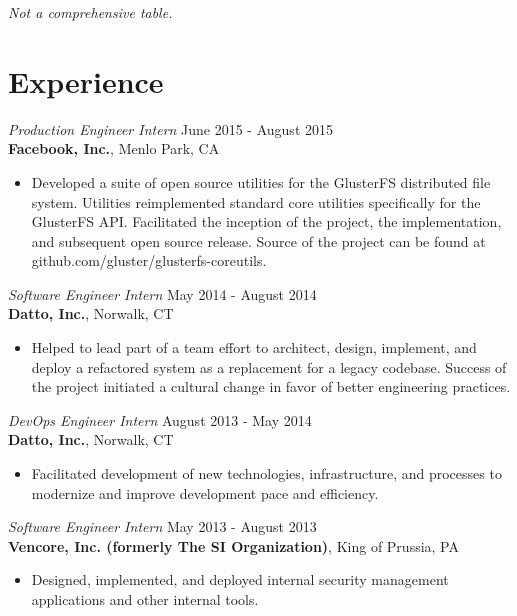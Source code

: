 \documentclass[margin]{res}
\begin{document}
\begin{resume}
\vspace{-0.25cm}
\textit{Not a comprehensive table.}

\section{Experience}

{\sl Production Engineer Intern} \hfill June 2015 - August 2015 \\
\textbf{Facebook, Inc.}, Menlo Park, CA
\begin{itemize}
    \item Developed a suite of open source utilities for the GlusterFS
          distributed file system. Utilities reimplemented standard core
          utilities specifically for the GlusterFS API. Facilitated the
          inception of the project, the implementation, and subsequent open
          source release. Source of the project can be found at
          github.com/gluster/glusterfs-coreutils.
\end{itemize}

{\sl Software Engineer Intern} \hfill May 2014 - August 2014 \\
\textbf{Datto, Inc.}, Norwalk, CT
\begin{itemize}
    \item Helped to lead part of a team effort to architect, design, implement,
          and deploy a refactored system as a replacement for a legacy
          codebase. Success of the project initiated a cultural change in favor
          of better engineering practices.
\end{itemize}

{\sl DevOps Engineer Intern} \hfill August 2013 - May 2014 \\
\textbf{Datto, Inc.}, Norwalk, CT
\begin{itemize}
    \item Facilitated development of new technologies, infrastructure, and
          processes to modernize and improve development pace and efficiency.
\end{itemize}
 
{\sl Software Engineer Intern} \hfill May 2013 - August 2013 \\
\textbf{Vencore, Inc. (formerly The SI Organization)}, King of Prussia, PA
\begin{itemize} 
    \item Designed, implemented, and deployed internal security management
          applications and other internal tools.
\end{itemize} 


\end{resume}
\end{document}
